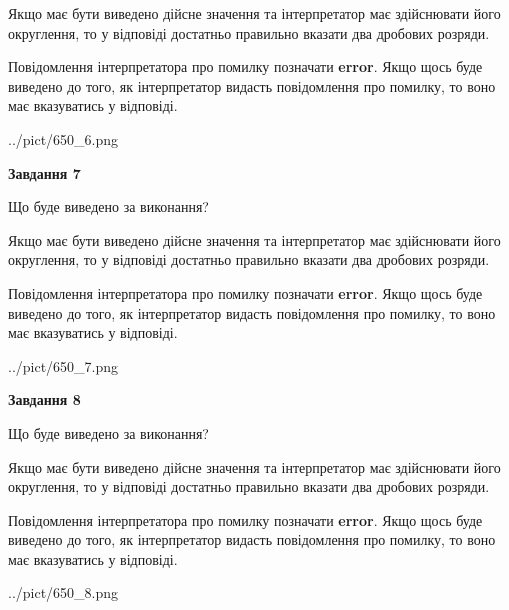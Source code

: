 \documentclass[12pt, ukrainian]{article}
\begin{document}
{\begin {Large}
Якщо має бути виведено дійсне значення та інтерпретатор має здійснювати його округлення, 
то у відповіді достатньо правильно вказати два дробових розряди.

Повідомлення інтерпретатора про помилку позначати \textbf{error}.
Якщо щось буде виведено до того, як інтерпретатор видасть повідомлення про помилку, 
то воно має вказуватись у відповіді. \par

\begin{center}
	{../pict/650_6.png}
\end{center}
\newpage

{\begin {center}\textbf{Завдання 7}\end {center}}\par
Що буде виведено за виконання? \par

Якщо має бути виведено дійсне значення та інтерпретатор має здійснювати його округлення, 
то у відповіді достатньо правильно вказати два дробових розряди.

Повідомлення інтерпретатора про помилку позначати \textbf{error}.
Якщо щось буде виведено до того, як інтерпретатор видасть повідомлення про помилку, 
то воно має вказуватись у відповіді. \par

\begin{center}
	{../pict/650_7.png}
\end{center}
\newpage

{\begin {center}\textbf{Завдання 8}\end {center}}\par
Що буде виведено за виконання? \par

Якщо має бути виведено дійсне значення та інтерпретатор має здійснювати його округлення, 
то у відповіді достатньо правильно вказати два дробових розряди.

Повідомлення інтерпретатора про помилку позначати \textbf{error}.
Якщо щось буде виведено до того, як інтерпретатор видасть повідомлення про помилку, 
то воно має вказуватись у відповіді. \par

\begin{center}
	{../pict/650_8.png}
\end{center}
\newpage


\end{Large}}
\end{document}
